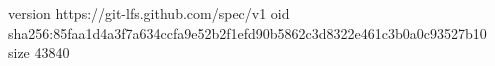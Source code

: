 version https://git-lfs.github.com/spec/v1
oid sha256:85faa1d4a3f7a634ccfa9e52b2f1efd90b5862c3d8322e461c3b0a0c93527b10
size 43840
